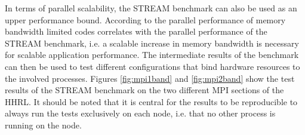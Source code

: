 In terms of parallel scalability, the STREAM benchmark can also be used as an upper performance bound. According to \cite{petsc-web-page} the parallel performance of memory bandwidth limited codes correlates with the parallel performance of the STREAM benchmark, i.e. a scalable increase in memory bandwidth is necessary for scalable application performance. The intermediate results of the benchmark can then be used to test different configurations that bind hardware resources to the involved processes. Figures \ref{fig:mpi1band} and \ref{fig:mpi2band} show the test results of the STREAM benchmark on the two different MPI sections of the HHRL. It should be noted that it is central for the results to be reproducible to always run the tests exclusively on each node, i.e. that no other process is running on the node. %


%    
%
%    
%
%
%    

